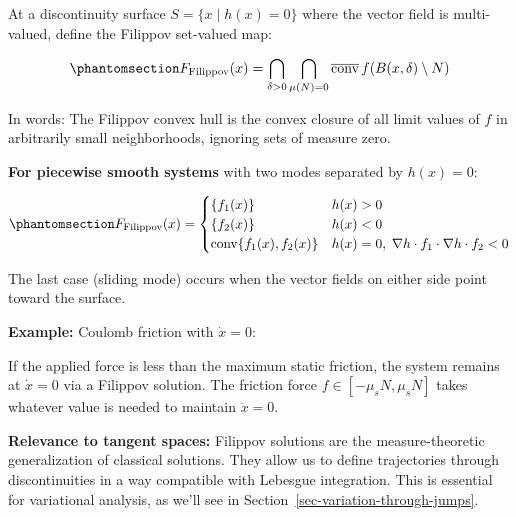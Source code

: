 \documentclass[
  letterpaper,
  DIV=11,
  numbers=noendperiod]{scrartcl}
\begin{document}
\begin{tcolorbox}[enhanced jigsaw, coltitle=black, titlerule=0mm, toprule=.15mm, opacitybacktitle=0.6, left=2mm, opacityback=0, rightrule=.15mm, leftrule=.75mm, breakable, colframe=quarto-callout-note-color-frame, bottomtitle=1mm, toptitle=1mm, arc=.35mm, title=\textcolor{quarto-callout-note-color}{\faInfo}\hspace{0.5em}{Filippov Solutions}, bottomrule=.15mm, colback=white, colbacktitle=quarto-callout-note-color!10!white]

At a discontinuity surface \(S = \{x \mid h(x) = 0\}\) where the vector
field is multi-valued, define the Filippov set-valued map:

\begin{equation}\phantomsection\label{eq-filippov}{
F_{\text{Filippov}}(x) = \bigcap_{\delta > 0} \bigcap_{\mu(N) = 0} \overline{\text{conv}} \, f(B(x, \delta) \setminus N)
}\end{equation}

In words: The Filippov convex hull is the convex closure of all limit
values of \(f\) in arbitrarily small neighborhoods, ignoring sets of
measure zero.

\textbf{For piecewise smooth systems} with two modes separated by
\(h(x) = 0\):

\begin{equation}\phantomsection\label{eq-filippov-piecewise}{
F_{\text{Filippov}}(x) = \begin{cases}
\{f_1(x)\} & h(x) > 0 \\
\{f_2(x)\} & h(x) < 0 \\
\text{conv}\{f_1(x), f_2(x)\} & h(x) = 0, \; \nabla h \cdot f_1 \cdot \nabla h \cdot f_2 < 0
\end{cases}
}\end{equation}

The last case (sliding mode) occurs when the vector fields on either
side point toward the surface.

\end{tcolorbox}

\textbf{Example:} Coulomb friction with \(\dot{x} = 0\):

If the applied force is less than the maximum static friction, the
system remains at \(\dot{x} = 0\) via a Filippov solution. The friction
force \(f \in [-\mu_s N, \mu_s N]\) takes whatever value is needed to
maintain \(\ddot{x} = 0\).

\textbf{Relevance to tangent spaces:} Filippov solutions are the
measure-theoretic generalization of classical solutions. They allow us
to define trajectories through discontinuities in a way compatible with
Lebesgue integration. This is essential for variational analysis, as
we'll see in Section~\ref{sec-variation-through-jumps}.
\end{document}
